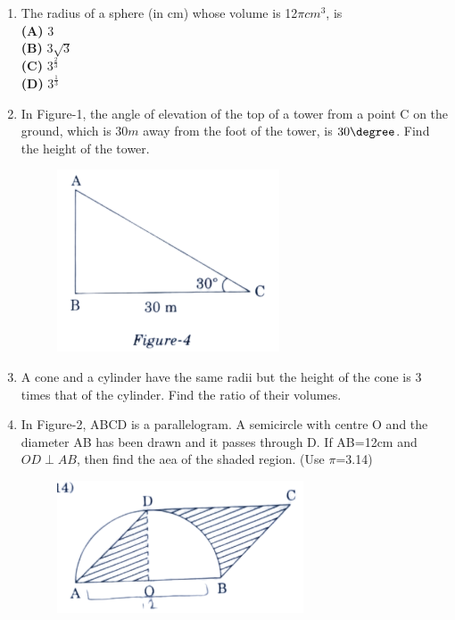 \begin{enumerate}
\item The radius of a sphere (in cm) whose volume is 12$\pi cm^3$, is\\
\textbf{(A)} $3$\\
\textbf{(B)} $3 \sqrt{3}$\\
\textbf{(C)} $3^\frac{2}{3}$\\
\textbf{(D)} $3^\frac{1}{3}$\\
\item In Figure-1, the angle of elevation of the top of a tower from a point C on the ground, which is $30m$ away from the foot of the tower, is $30\degree$. Find the height of the tower.                                                                                                
	\begin{figure}[H]
	\centering                
  	\includegraphics[width=0.5\columnwidth]{figs/Fig-4.png}                                                                                 	
   	\caption{}                                                                         
  	\label{}
	\end{figure}
\item A cone and a cylinder have the same radii but the height of the cone is 3 times that of the cylinder. Find the ratio of their volumes.\\
\item In Figure-2, ABCD is a parallelogram. A semicircle with centre O and the diameter AB has been drawn and it passes through D. If AB=12cm and $OD \perp AB$, then find the aea of the shaded region. (Use $\pi$=3.14)\\
          \begin{figure}[H]
                  \centering
                  \includegraphics[width=0.5\columnwidth]{figs/Fig-8.png}

\end{figure}
\end{enumerate}
